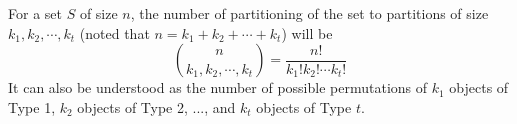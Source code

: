 \begin{proposition}
    For a set \(S\) of size \(n\), the number of partitioning of the set to partitions of size \(k_1, k_2, \cdots, k_t\) (noted that \(n = k_1 + k_2 + \cdots + k_t\)) will be
    \[
        \binom{n}{k_1, k_2, \cdots, k_t} = \dfrac{n!}{k_1!k_2!\cdots k_t!}
    \]
    It can also be understood as the number of possible permutations of \(k_1\) objects of Type 1, \(k_2\) objects of Type 2, ..., and \(k_t\) objects of Type \(t\).
\end{proposition}

